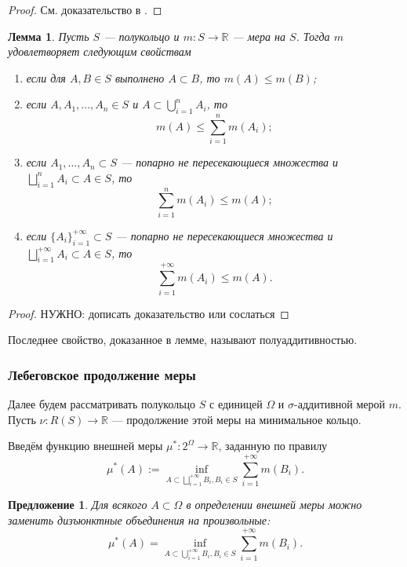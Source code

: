 \documentclass[12pt]{article}
\newtheorem{proposition}[theorem]{Предложение}
\newtheorem{lemma}[theorem]{Лемма}
\numberwithin{theorem}{section}
\theoremstyle{definition}
\newcommand{\RR}{\mathbb{R}}
\newcommand{\defin}[2]{\hypertarget{#2}{{\color{red} #1}}}
\newcommand{\TODO}[1]{\textcolor{todocolor}{НУЖНО: #1}}
\begin{document}
	\begin{proof}
		См. доказательство в \cite[Глава 1, Теорема 2.2]{DiyachenoUliyanov}.
	\end{proof}
	
	\begin{lemma}
		Пусть $ S $ --- полукольцо и $ m \colon S \to \mathbb{R} $ --- мера на $ S $.
		Тогда $ m $ удовлетворяет следующим свойствам
		\begin{enumerate}
			\item если для $ A, B \in S $ выполнено $ A \subset B $, то $ m(A) \leqslant m(B) $;
			\item если $ A, A_1, \ldots, A_n \in S $ и $ A \subset \bigcup\limits_{i = 1}^{n} A_i $, 
			то $$ m(A) \leqslant \sum\limits_{i = 1}^{n} m(A_i); $$
			\item если $ A_1, \ldots, A_n \subset S $ ---  попарно не пересекающиеся множества
			и $ \bigsqcup\limits_{i = 1}^{n} A_i \subset A \in S $, то 
			$$ \sum\limits_{i = 1}^{n} m(A_i) \leqslant m(A); $$
			\item если $ \{A_i\}_{i = 1}^{+\infty} \subset S $ ---  попарно не пересекающиеся множества
			и $ \bigsqcup\limits_{i = 1}^{+\infty} A_i \subset A \in S $, то 
			$$ \sum\limits_{i = 1}^{+\infty} m(A_i) \leqslant m(A). $$
		\end{enumerate}
	\end{lemma}
	
	\begin{proof}
		\TODO{дописать доказательство или сослаться}
	\end{proof}
	
	Последнее свойство, доказанное в лемме, называют \defin{полуаддитивностью}{semi-additivity}.
	
	\subsubsection{Лебеговское продолжение меры}
	
	Далее будем рассматривать полукольцо $ S $ с единицей $ \Omega $
	и $ \sigma $-аддитивной мерой $ m $.
	Пусть $ \nu \colon R(S) \to \RR $ --- продолжение этой меры на минимальное кольцо.
	
	Введём функцию \defin{внешней меры}{outer-measure} $ \mu^* \colon 2^{\Omega} \to \RR $, заданную по правилу
	$$ \mu^*(A) := \inf\limits_{A \subset \bigsqcup\limits_{i = 1}^{+\infty} B_i, B_i \in S} 
	\sum\limits_{i = 1}^{+\infty} m(B_i). $$
	
	\begin{proposition}
		Для всякого $ A \subset \Omega $ в определении внешней меры можно заменить дизъюнктные объединения на произвольные:
		$$ \mu^*(A) = \inf\limits_{A \subset \bigcup\limits_{i = 1}^{+\infty} B_i, B_i \in S} 
		\sum\limits_{i = 1}^{+\infty} m(B_i). $$
	\end{proposition}
	
\end{document}
